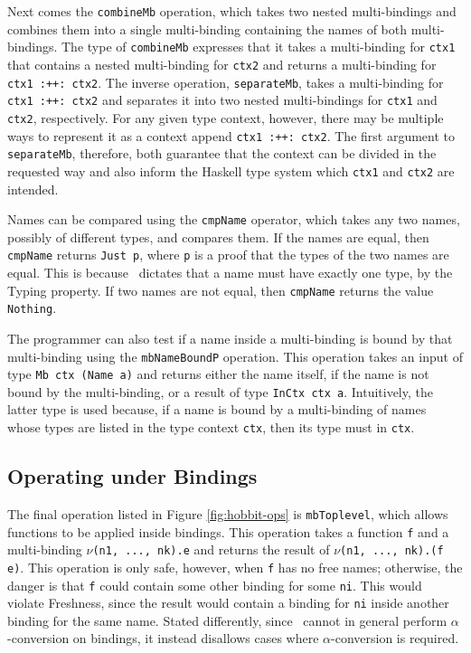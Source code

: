 \documentclass[natbib]{sigplanconf}
\begin{document}
Next comes the \lstinline{combineMb} operation, which takes two nested
multi-bindings and combines them into a single multi-binding
containing the names of both multi-bindings. The type of
\lstinline{combineMb} expresses that it takes a multi-binding for
\lstinline{ctx1} that contains a nested multi-binding for
\lstinline{ctx2} and returns a multi-binding for
\lstinline{ctx1 :++: ctx2}.  The inverse operation,
\lstinline{separateMb}, takes a multi-binding for
\lstinline{ctx1 :++: ctx2} and separates it into two nested
multi-bindings for \lstinline{ctx1} and \lstinline{ctx2},
respectively. For any given type context, however, there may be multiple ways
to represent it as a context append \lstinline{ctx1 :++: ctx2}. The first
argument to \lstinline{separateMb}, therefore, both guarantee that the context
can be divided in the requested way and also inform the Haskell type system
which \lstinline{ctx1} and \lstinline{ctx2} are intended.


Names can be compared using the \lstinline{cmpName} operator, which
takes any two names, possibly of different types, and compares them.
If the names are equal, then \lstinline{cmpName} returns
\lstinline{Just p}, where \lstinline{p} is a proof that the types of
the two names are equal. This is because \ourlib\ dictates that a name
must have exactly one type, by the Typing property. If two names are
not equal, then \lstinline{cmpName} returns the value
\lstinline{Nothing}.

The programmer can also test if a name inside a multi-binding is bound
by that multi-binding using the \lstinline{mbNameBoundP} operation.
This operation takes an input of type \lstinline{Mb ctx (Name a)} and
returns either the name itself, if the name is not bound by the
multi-binding, or a result of type \lstinline{InCtx ctx a}.
Intuitively, the latter type is used because, if a name is bound by a
multi-binding of names whose types are listed in the type context
\lstinline{ctx}, then its type must in \lstinline{ctx}.


\subsection{Operating under Bindings}
\label{subsec:mbtoplevel}

The final operation listed in Figure \ref{fig:hobbit-ops} is
\lstinline{mbToplevel}, which allows functions to be applied inside
bindings. This operation takes a function \lstinline{f} and a
multi-binding
$\nu$\lstinline{(n1, ..., nk).e} and returns the result of
$\nu$\lstinline{(n1, ..., nk).(f e)}. This operation is only safe,
however, when \lstinline{f} has no free names; otherwise, the danger
is that \lstinline{f} could contain some other binding for some
\lstinline{ni}. This would violate Freshness, since the result would
contain a binding for \lstinline{ni} inside another binding for the
same name. Stated differently, since \ourlib\ cannot in general
perform $\alpha$-conversion on bindings, it instead disallows cases
where $\alpha$-conversion is required.
\end{document}

